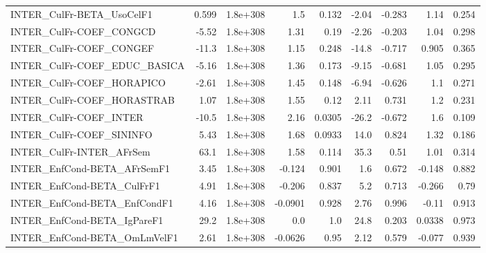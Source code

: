 \begin{tabular}{lrrrrrrrr}
INTER\_CulFr-BETA\_UsoCelF1             &       0.599 &     1.8e+308 &     1.5 &    0.132 &      -2.04 &      -0.283 &         1.14 &         0.254 \\
INTER\_CulFr-COEF\_CONGCD               &       -5.52 &     1.8e+308 &    1.31 &     0.19 &      -2.26 &      -0.203 &         1.04 &         0.298 \\
INTER\_CulFr-COEF\_CONGEF               &       -11.3 &     1.8e+308 &    1.15 &    0.248 &      -14.8 &      -0.717 &        0.905 &         0.365 \\
INTER\_CulFr-COEF\_EDUC\_BASICA          &       -5.16 &     1.8e+308 &    1.36 &    0.173 &      -9.15 &      -0.681 &         1.05 &         0.295 \\
INTER\_CulFr-COEF\_HORAPICO             &       -2.61 &     1.8e+308 &    1.45 &    0.148 &      -6.94 &      -0.626 &          1.1 &         0.271 \\
INTER\_CulFr-COEF\_HORASTRAB            &        1.07 &     1.8e+308 &    1.55 &     0.12 &       2.11 &       0.731 &          1.2 &         0.231 \\
INTER\_CulFr-COEF\_INTER                &       -10.5 &     1.8e+308 &    2.16 &   0.0305 &      -26.2 &      -0.672 &          1.6 &         0.109 \\
INTER\_CulFr-COEF\_SININFO              &        5.43 &     1.8e+308 &    1.68 &   0.0933 &       14.0 &       0.824 &         1.32 &         0.186 \\
INTER\_CulFr-INTER\_AFrSem              &        63.1 &     1.8e+308 &    1.58 &    0.114 &       35.3 &        0.51 &         1.01 &         0.314 \\
INTER\_EnfCond-BETA\_AFrSemF1           &        3.45 &     1.8e+308 &  -0.124 &    0.901 &        1.6 &       0.672 &       -0.148 &         0.882 \\
INTER\_EnfCond-BETA\_CulFrF1            &        4.91 &     1.8e+308 &  -0.206 &    0.837 &        5.2 &       0.713 &       -0.266 &          0.79 \\
INTER\_EnfCond-BETA\_EnfCondF1          &        4.16 &     1.8e+308 & -0.0901 &    0.928 &       2.76 &       0.996 &        -0.11 &         0.913 \\
INTER\_EnfCond-BETA\_IgPareF1           &        29.2 &     1.8e+308 &     0.0 &      1.0 &       24.8 &       0.203 &       0.0338 &         0.973 \\
INTER\_EnfCond-BETA\_OmLmVelF1          &        2.61 &     1.8e+308 & -0.0626 &     0.95 &       2.12 &       0.579 &       -0.077 &         0.939 \\

\end{tabular}
